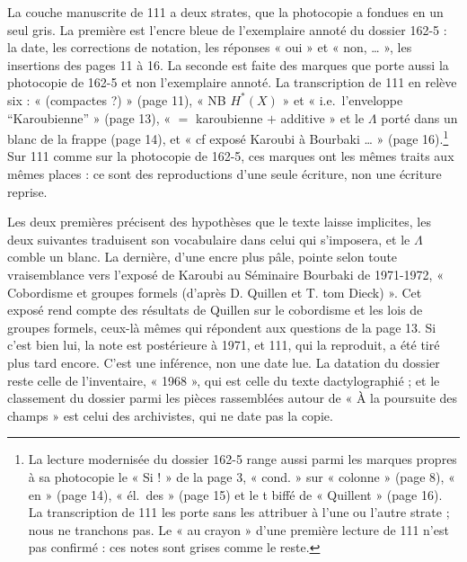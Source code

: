 \documentclass[11pt,a4paper]{article}
\begin{document}
La couche manuscrite de 111 a deux strates, que la photocopie a fondues en un
seul gris. La première est l'encre bleue de l'exemplaire annoté du dossier
162-5 : la date, les corrections de notation, les réponses « oui » et « non,
… », les insertions des pages 11 à 16. La seconde est faite des marques que
porte aussi la photocopie de 162-5 et non l'exemplaire annoté. La
transcription de 111 en relève six : « (compactes ?) » (page 11), « NB
$H^{*}(X)$ » et « i.e.\ l'enveloppe “Karoubienne” » (page 13), « $=$
karoubienne $+$ additive » et le $\Lambda$ porté dans un blanc de la frappe
(page 14), et « cf exposé Karoubi à Bourbaki … » (page 16).\footnote{La lecture
modernisée du dossier 162-5 range aussi parmi les marques propres à sa
photocopie le « Si ! » de la page 3, « cond. » sur « colonne » (page 8), « en »
(page 14), « él.\ des » (page 15) et le t biffé de « Quillent » (page 16). La
transcription de 111 les porte sans les attribuer à l'une ou l'autre strate ;
nous ne tranchons pas. Le « au crayon » d'une première lecture de 111 n'est
pas confirmé : ces notes sont grises comme le reste.} Sur 111 comme sur la
photocopie de 162-5, ces marques ont les mêmes traits aux mêmes places : ce
sont des reproductions d'une seule écriture, non une écriture reprise.

Les deux premières précisent des hypothèses que le texte laisse implicites,
les deux suivantes traduisent son vocabulaire dans celui qui s'imposera, et le
$\Lambda$ comble un blanc. La
dernière, d'une encre plus pâle, pointe selon toute vraisemblance vers l'exposé
de Karoubi au Séminaire Bourbaki de 1971-1972, « Cobordisme et groupes formels
(d'après D. Quillen et T. tom Dieck) ». Cet exposé rend compte des résultats de
Quillen sur le cobordisme et les lois de groupes formels, ceux-là mêmes qui
répondent aux questions de la page 13. Si c'est bien lui, la note est
postérieure à 1971, et 111, qui la reproduit, a été tiré plus tard encore.
C'est une inférence, non une date lue. La datation du dossier reste celle de
l'inventaire, « 1968 », qui est celle du texte dactylographié ; et le
classement du dossier parmi les pièces rassemblées autour de « À la poursuite
des champs » est celui des archivistes, qui ne date pas la copie.
\end{document}

